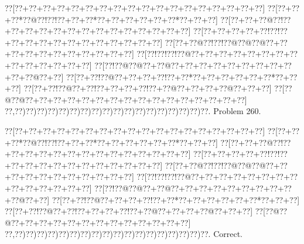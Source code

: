 \documentclass[a5paper]{article}
\begin{document}
\begin{center}
{\goo
\0??[\0??+\0??+\0??+\0??+\0??+\0??+\0??+\0??+\0??+\0??+\0??+\0??+\0??+\0??+\0??+\0??+\0??+\0??]
\0??[\0??+\0??+\0??*\0??@\0??!\0??!\0??+\0??+\0??*\0??+\0??+\0??+\0??+\0??+\0??*\0??+\0??+\0??]
\0??[\0??+\0??+\0??@\0??!\0??+\0??+\0??+\0??+\0??+\0??+\0??+\0??+\0??+\0??+\0??+\0??+\0??+\0??]
\0??[\0??+\0??+\0??+\0??+\0??!\0??!\0??+\0??+\0??+\0??+\0??+\0??+\0??+\0??+\0??+\0??+\0??+\0??]
\0??[\0??+\0??@\0??!\0??!\0??@\0??@\0??@\0??+\0??+\0??+\0??+\0??+\0??+\0??+\0??+\0??+\0??+\0??]
\0??[\0??!\0??!\0??!\0??@\0??+\0??+\0??+\0??+\0??+\0??+\0??+\0??+\0??+\0??+\0??+\0??+\0??+\0??]
\0??[\0??!\0??@\0??@\0??+\0??@\0??+\0??+\0??+\0??+\0??+\0??+\0??+\0??+\0??+\0??+\0??@\0??+\0??]
\0??[\0??+\0??!\0??@\0??+\0??+\0??+\0??!\0??+\0??*\0??+\0??+\0??+\0??+\0??+\0??*\0??+\0??+\0??]
\0??[\0??+\0??!\0??@\0??+\0??!\0??+\0??+\0??+\0??!\0??+\0??@\0??+\0??+\0??+\0??@\0??+\0??+\0??]
\0??[\0??@\0??@\0??+\0??+\0??+\0??+\0??+\0??+\0??+\0??+\0??+\0??+\0??+\0??+\0??+\0??+\0??+\0??]
\0??,\0??)\0??)\0??)\0??)\0??)\0??)\0??)\0??)\0??)\0??)\0??)\0??)\0??)\0??)\0??)\0??)\0??)\0??.
}
Problem 260.

\end{center}
\begin{center}
{\goo
\0??[\0??+\0??+\0??+\0??+\0??+\0??+\0??+\0??+\0??+\0??+\0??+\0??+\0??+\0??+\0??+\0??+\0??+\0??]
\0??[\0??+\0??+\0??*\0??@\0??!\0??!\0??+\0??+\0??*\0??+\0??+\0??+\0??+\0??+\0??*\0??+\0??+\0??]
\0??[\0??+\0??+\0??@\0??!\0??+\0??+\0??+\0??+\0??+\0??+\0??+\0??+\0??+\0??+\0??+\0??+\0??+\0??]
\0??[\0??+\0??+\0??+\0??+\0??!\0??!\0??+\0??+\0??+\0??+\0??+\0??+\0??+\0??+\0??+\0??+\0??+\0??]
\0??[\0??+\0??@\0??!\0??!\0??@\0??@\0??@\0??+\0??+\0??+\0??+\0??+\0??+\0??+\0??+\0??+\0??+\0??]
\0??[\0??!\0??!\0??!\0??@\0??+\0??+\0??+\0??+\0??+\0??+\0??+\0??+\0??+\0??+\0??+\0??+\0??+\0??]
\0??[\0??!\0??@\0??@\0??+\0??@\0??+\0??+\0??+\0??+\0??+\0??+\0??+\0??+\0??+\0??@\0??+\0??]
\0??[\0??+\0??!\0??@\0??+\0??+\0??+\0??!\0??+\0??*\0??+\0??+\0??+\0??+\0??+\0??*\0??+\0??+\0??]
\0??[\0??+\0??!\0??@\0??+\0??!\0??+\0??+\0??+\0??!\0??+\0??@\0??+\0??+\0??+\0??@\0??+\0??+\0??]
\0??[\0??@\0??@\0??+\0??+\0??+\0??+\0??+\0??+\0??+\0??+\0??+\0??+\0??+\0??+\0??]
\0??,\0??)\0??)\0??)\0??)\0??)\0??)\0??)\0??)\0??)\0??)\0??)\0??)\0??)\0??)\0??)\0??)\0??)\0??.
}
Correct. 

\end{center}
\end{document}
